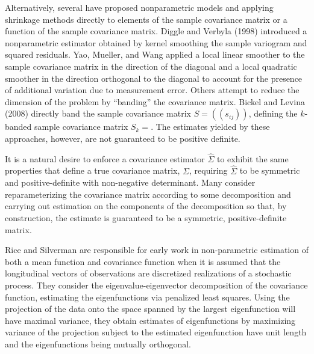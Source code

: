  Alternatively, several have proposed nonparametric models and applying shrinkage methods directly to elements of the sample covariance matrix or a function of the sample covariance matrix. Diggle and Verbyla (1998) introduced a nonparametric estimator obtained by kernel smoothing the sample variogram and squared residuals.  Yao, Mueller, and Wang applied a local linear smoother to the sample covariance matrix in the direction of the diagonal and a local quadratic smoother in the direction orthogonal to the diagonal to account for the presence of additional variation due to measurement error. Others attempt to reduce the dimension of the problem by ``banding'' the covariance matrix. Bickel and Levina (2008) directly band the sample covariance matrix $S = \left(\left( s_{ij}\right) \right)$, defining the $k$-banded sample covariance matrix $S_k = $. The estimates yielded by these approaches, however, are not guaranteed to be positive definite. 

It is a natural desire to enforce a covariance estimator $\hat{\Sigma}$ to exhibit the same properties that define a true covariance matrix, $\Sigma$, requiring $\hat{\Sigma}$ to be symmetric and positive-definite with non-negative determinant. Many consider reparameterizing the covariance matrix according to some decomposition and carrying out estimation on the components of the decomposition so that, by construction, the estimate is guaranteed to be a symmetric, positive-definite matrix. 


Rice and Silverman are responsible for early work in non-parametric estimation of both a mean function and covariance function when it is assumed that the longitudinal vectors of observations are discretized realizations of a stochastic process. They consider the eigenvalue-eigenvector decomposition of the covariance function, estimating the eigenfunctions via penalized least squares. Using the projection of the data onto the space spanned by the largest eigenfunction will have maximal variance, they obtain estimates of eigenfunctions by maximizing variance of the projection subject to the estimated eigenfunction have unit length and the eigenfunctions being mutually orthogonal.  


